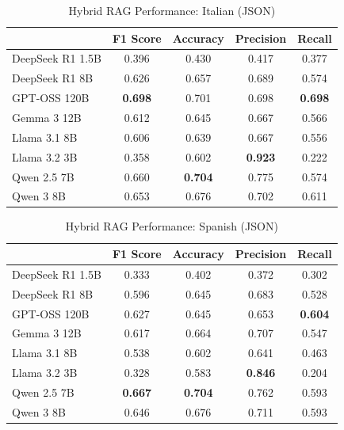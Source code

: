 \begin{table}[!htbp]
\caption{Hybrid RAG Performance: Italian (JSON)}
\label{tab:hybrid_italian_json}
\begin{tabular}{lcccc}
\toprule
 & F1 Score & Accuracy & Precision & Recall \\
\midrule
DeepSeek R1 1.5B & 0.396 & 0.430 & 0.417 & 0.377 \\
DeepSeek R1 8B & 0.626 & 0.657 & 0.689 & 0.574 \\
GPT-OSS 120B & \textbf{0.698} & 0.701 & 0.698 & \textbf{0.698} \\
Gemma 3 12B & 0.612 & 0.645 & 0.667 & 0.566 \\
Llama 3.1 8B & 0.606 & 0.639 & 0.667 & 0.556 \\
Llama 3.2 3B & 0.358 & 0.602 & \textbf{0.923} & 0.222 \\
Qwen 2.5 7B & 0.660 & \textbf{0.704} & 0.775 & 0.574 \\
Qwen 3 8B & 0.653 & 0.676 & 0.702 & 0.611 \\
\bottomrule
\end{tabular}
\end{table}


\begin{table}[!htbp]
\caption{Hybrid RAG Performance: Spanish (JSON)}
\label{tab:hybrid_spanish_json}
\begin{tabular}{lcccc}
\toprule
 & F1 Score & Accuracy & Precision & Recall \\
\midrule
DeepSeek R1 1.5B & 0.333 & 0.402 & 0.372 & 0.302 \\
DeepSeek R1 8B & 0.596 & 0.645 & 0.683 & 0.528 \\
GPT-OSS 120B & 0.627 & 0.645 & 0.653 & \textbf{0.604} \\
Gemma 3 12B & 0.617 & 0.664 & 0.707 & 0.547 \\
Llama 3.1 8B & 0.538 & 0.602 & 0.641 & 0.463 \\
Llama 3.2 3B & 0.328 & 0.583 & \textbf{0.846} & 0.204 \\
Qwen 2.5 7B & \textbf{0.667} & \textbf{0.704} & 0.762 & 0.593 \\
Qwen 3 8B & 0.646 & 0.676 & 0.711 & 0.593 \\
\bottomrule
\end{tabular}
\end{table}
